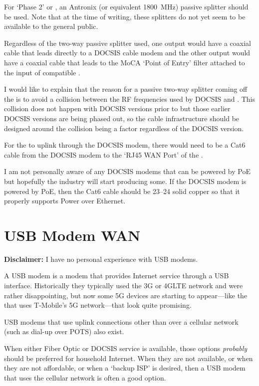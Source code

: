 For  `Phase 2' or , an Antronix
 (or equivalent \SI{1800}{\mega\hertz})
passive splitter should be used. Note that at the time of writing, these splitters do not yet seem to be
available to the general public.

Regardless of the two-way passive splitter used, one output would have a coaxial cable that leads directly
to a DOCSIS cable modem and the other output would have a coaxial cable that leads to the MoCA `Point of
Entry' filter attached to the input of \xdband{} compatible .

I would like to explain that the reason for a passive two-way splitter coming off the  is to avoid a collision between the RF frequencies used by DOCSIS and \xdband{}. This
collision does not happen with DOCSIS versions prior to  but those earlier DOCSIS versions are
being phased out, so the cable infrastructure should be designed around the collision being a factor regardless
of the DOCSIS version.

For the  to uplink through the DOCSIS modem, there would need to be a Cat6 cable from the
DOCSIS modem to the `RJ45 WAN Port' of the .

I am not personally aware of any DOCSIS modems that can be powered by PoE but hopefully the industry will
start producing some. If the DOCSIS modem is powered by PoE, then the Cat6 cable should be \SIrange{23}{24}{\awg}
solid copper so that it properly supports Power over Ethernet.

\section{USB Modem WAN}

\textbf{Disclaimer:} I have no personal experience with USB modems.

A USB modem is a modem that provides Internet service through a USB interface. Historically they typically
used the 3G or 4GLTE network and were rather disappointing, but now some 5G devices are starting to
appear---like the  that uses T-Mobile's
5G network---that look quite promising.

USB modems that use uplink connections other than over a cellular network (such as dial-up over POTS) also
exist.

When either Fiber Optic or DOCSIS service is available, those options \emph{probably} should be preferred
for household Internet. When they are not available, or when they are not affordable, or when a `backup ISP'
is desired, then a USB modem that uses the cellular network is often a good option.

